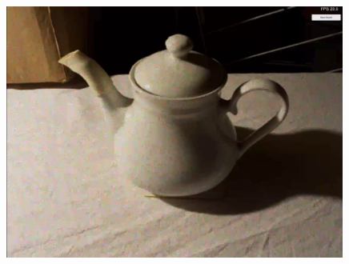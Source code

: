 \begin{figure}[H]
\begin{minipage}{0.475\textwidth}
        \includegraphics[width=0.99\textwidth]{Figures/TeapotReal.png} %
    \end{minipage}
\end{figure}